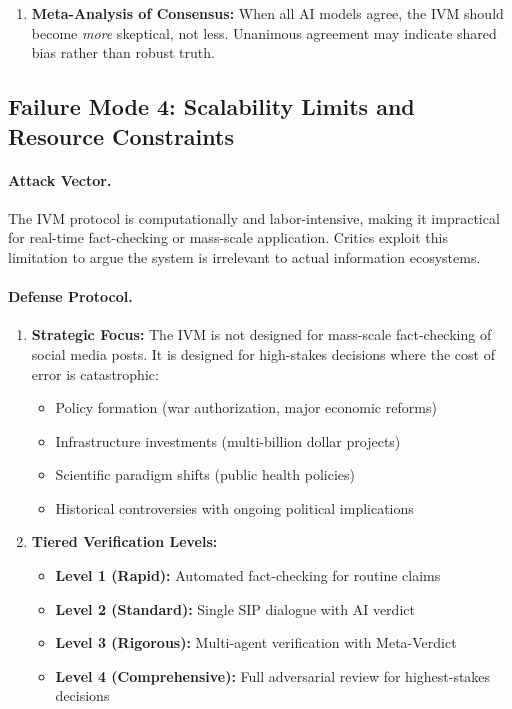 \documentclass[11pt,a4paper]{article}
\begin{document}
\begin{small}
\begin{enumerate}
    \item \textbf{Meta-Analysis of Consensus:} When all AI models agree, the IVM should become \textit{more} skeptical, not less. Unanimous agreement may indicate shared bias rather than robust truth.
\end{enumerate}

\subsection{Failure Mode 4: Scalability Limits and Resource Constraints}

\paragraph{Attack Vector.} The IVM protocol is computationally and labor-intensive, making it impractical for real-time fact-checking or mass-scale application. Critics exploit this limitation to argue the system is irrelevant to actual information ecosystems.

\paragraph{Defense Protocol.}

\begin{enumerate}
    \item \textbf{Strategic Focus:} The IVM is not designed for mass-scale fact-checking of social media posts. It is designed for high-stakes decisions where the cost of error is catastrophic:
    \begin{itemize}
        \item Policy formation (war authorization, major economic reforms)
        \item Infrastructure investments (multi-billion dollar projects)
        \item Scientific paradigm shifts (public health policies)
        \item Historical controversies with ongoing political implications
    \end{itemize}
    
    \item \textbf{Tiered Verification Levels:}
    \begin{itemize}
        \item \textbf{Level 1 (Rapid):} Automated fact-checking for routine claims
        \item \textbf{Level 2 (Standard):} Single SIP dialogue with AI verdict
        \item \textbf{Level 3 (Rigorous):} Multi-agent verification with Meta-Verdict
        \item \textbf{Level 4 (Comprehensive):} Full adversarial review for highest-stakes decisions
    \end{itemize}
    

\end{enumerate}
\end{small}
\end{document}
